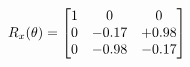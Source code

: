 \documentclass[preview]{standalone}
\begin{document}
\begin{align*}
\special{dvisvgm:raw <g id='unique000'>}R_{x}(\theta) = \begin{bmatrix}1 & 0 & 0 \\0 & -0.17 & +0.98 \\0 & -0.98 & -0.17\end{bmatrix}\special{dvisvgm:raw </g>}
\end{align*}
\end{document}
